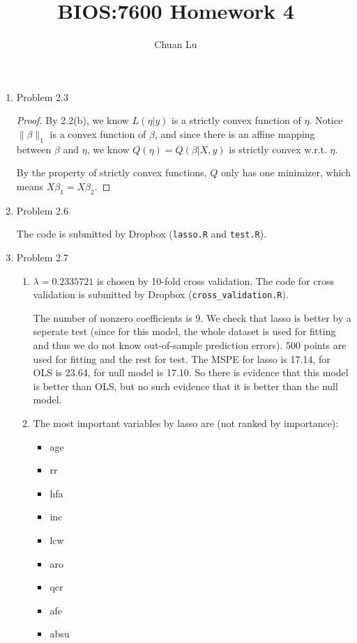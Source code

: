 \documentclass{article}
\begin{document}
\author{Chuan Lu}
\title{BIOS:7600 Homework 4}
\maketitle

\medskip

\begin{enumerate}

\item Problem 2.3

\begin{proof}
By 2.2(b), we know $L(\eta |y)$ is a strictly convex function of $\eta$. Notice $\lVert \beta \rVert_1 $ is a convex function of $\beta$, and since there is an affine mapping between $\beta$ and $\eta$, we know $Q(\eta) = Q(\beta| X, y)$ is strictly convex w.r.t. $\eta$. 

By the property of strictly convex functions, $Q$ only has one minimizer, which means $X\beta_1 = X\beta_2 $.
\end{proof}

\item Problem 2.6

The code is submitted by Dropbox (\texttt{lasso.R} and \texttt{test.R}).

\item Problem 2.7

\begin{enumerate}
\item $\lambda = 0.2335721$ is chosen by 10-fold cross validation. The code for cross validation is submitted by Dropbox (\texttt{cross\_validation.R}).

The number of nonzero coefficients is 9. We check that lasso is better by a seperate test (since for this model, the whole dataset is used for fitting and thus we do not know out-of-sample prediction errors). 500 points are used for fitting and the rest for test. The MSPE for lasso is 17.14, for OLS is 23.64, for null model is 17.10. So there is evidence that this model is better than OLS, but no such evidence that it is better than the null model.

\item The most important variables by lasso are (not ranked by importance):
\begin{itemize}
\item age
\item rr
\item hfa
\item inc
\item lcw
\item aro
\item qcr
\item afe
\item absu
\end{itemize}


\end{enumerate}
\end{enumerate}
\end{document}
